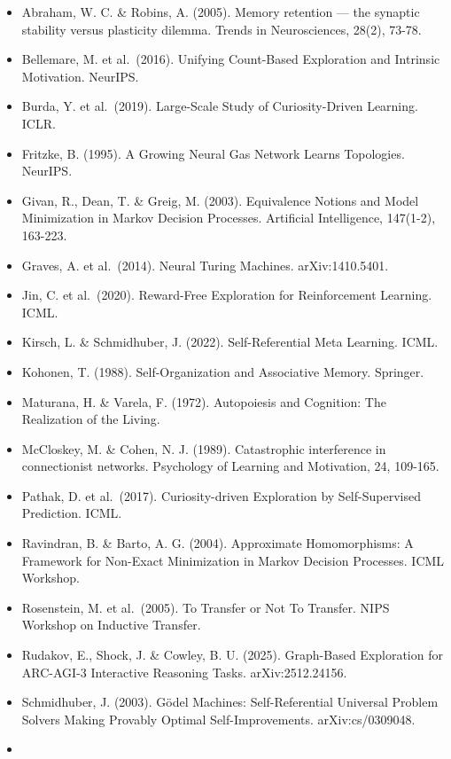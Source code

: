 \documentclass[
  11pt,
]{article}
\providecommand{\tightlist}{%
  \setlength{\itemsep}{0pt}\setlength{\parskip}{0pt}}
\begin{document}
\begin{itemize}
\tightlist
\item
  Abraham, W. C. \& Robins, A. (2005). Memory retention --- the synaptic
  stability versus plasticity dilemma. Trends in Neurosciences, 28(2),
  73-78.
\item
  Bellemare, M. et al.~(2016). Unifying Count-Based Exploration and
  Intrinsic Motivation. NeurIPS.
\item
  Burda, Y. et al.~(2019). Large-Scale Study of Curiosity-Driven
  Learning. ICLR.
\item
  Fritzke, B. (1995). A Growing Neural Gas Network Learns Topologies.
  NeurIPS.
\item
  Givan, R., Dean, T. \& Greig, M. (2003). Equivalence Notions and Model
  Minimization in Markov Decision Processes. Artificial Intelligence,
  147(1-2), 163-223.
\item
  Graves, A. et al.~(2014). Neural Turing Machines. arXiv:1410.5401.
\item
  Jin, C. et al.~(2020). Reward-Free Exploration for Reinforcement
  Learning. ICML.
\item
  Kirsch, L. \& Schmidhuber, J. (2022). Self-Referential Meta Learning.
  ICML.
\item
  Kohonen, T. (1988). Self-Organization and Associative Memory.
  Springer.
\item
  Maturana, H. \& Varela, F. (1972). Autopoiesis and Cognition: The
  Realization of the Living.
\item
  McCloskey, M. \& Cohen, N. J. (1989). Catastrophic interference in
  connectionist networks. Psychology of Learning and Motivation, 24,
  109-165.
\item
  Pathak, D. et al.~(2017). Curiosity-driven Exploration by
  Self-Supervised Prediction. ICML.
\item
  Ravindran, B. \& Barto, A. G. (2004). Approximate Homomorphisms: A
  Framework for Non-Exact Minimization in Markov Decision Processes.
  ICML Workshop.
\item
  Rosenstein, M. et al.~(2005). To Transfer or Not To Transfer. NIPS
  Workshop on Inductive Transfer.
\item
  Rudakov, E., Shock, J. \& Cowley, B. U. (2025). Graph-Based
  Exploration for ARC-AGI-3 Interactive Reasoning Tasks.
  arXiv:2512.24156.
\item
  Schmidhuber, J. (2003). Gödel Machines: Self-Referential Universal
  Problem Solvers Making Provably Optimal Self-Improvements.
  arXiv:cs/0309048.
\item

\end{itemize}
\end{document}
